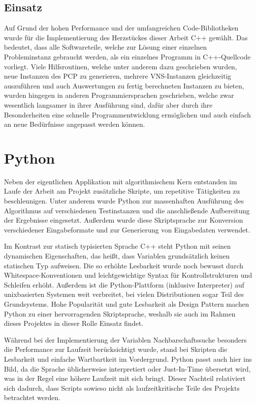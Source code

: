 \subsection{Einsatz}
Auf Grund der hohen Performance und der umfangreichen Code-Bibliotheken wurde für die Implementierung des Herzstückes dieser Arbeit C++ gewählt. Das bedeutet, dass alle Softwareteile, welche zur Lösung einer
einzelnen Probleminstanz gebraucht werden, als ein einzelnes Programm in C++-Quellcode vorliegt. Viele Hilfsroutinen, welche unter anderem dazu ge\-schrie\-ben wurden, neue Instanzen des PCP zu generieren, 
mehrere VNS-Instanzen gleichzeitig auszuführen und auch Auswertungen zu fertig berechneten Instanzen zu bieten, wurden hingegen in anderen Programmiersprachen geschrieben, welche zwar wesentlich langsamer
in ihrer Ausführung sind, dafür aber durch ihre Besonderheiten eine schnelle Programmentwicklung ermöglichen und auch einfach an neue Bedürfnisse angepasst werden können.

\section{Python}
\label{sec:python}
Neben der eigentlichen Applikation mit algorithmischem Kern entstanden im Laufe der Arbeit am Projekt zusätzliche Skripte, um repetitive Tätigkeiten zu beschleunigen. Unter anderem wurde Python zur massenhaften Ausführung des Algorithmus auf verschiedenen Testinstanzen und die anschließende Aufbereitung der Ergebnisse eingesetzt. Außerdem wurde diese Skriptsprache zur Konversion verschiedener Eingabeformate und zur Generierung von Eingabedaten verwendet.

Im Kontrast zur statisch typisierten Sprache C++ steht Python mit seinen dynamischen Eigenschaften, das heißt, dass Variablen grundsätzlich keinen statischen Typ aufweisen. Die so erhöhte Lesbarkeit wurde noch bewusst durch Whitespace-Konventionen und leichtgewichtige Syntax für Kontrollstrukturen und Schleifen erhöht. Außerdem ist die Python-Plattform (inklusive Interpreter) auf unixbasierten Systemen weit verbreitet, bei vielen Distributionen sogar Teil des Grundsystems. Hohe Popularität und gute Lesbarkeit als Design Pattern machen Python zu einer hervorragenden Skriptsprache, weshalb sie auch im Rahmen dieses Projektes in dieser Rolle Einsatz findet.

Während bei der Implementierung der Variablen Nachbarschaftssuche besonders die Performance zur Laufzeit berücksichtigt wurde, stand bei Skripten die Lesbarkeit und einfache Wartbartkeit im Vordergrund. Python passt auch hier ins Bild, da die Sprache üblicherweise interpretiert oder Just-In-Time übersetzt wird, was in der Regel eine höhere Laufzeit mit sich bringt. Dieser Nachteil relativiert sich dadurch, dass Scripts sowieso nicht als laufzeitkritische Teile des Projekts betrachtet werden.

